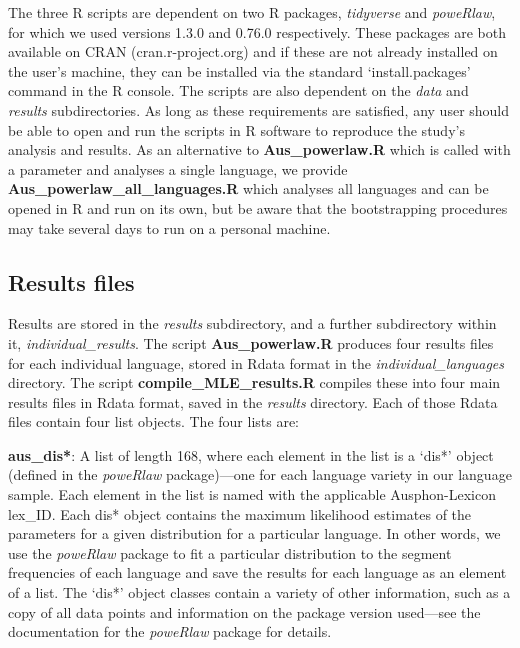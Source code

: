 The three R scripts are dependent on two R packages, \emph{tidyverse}
and \emph{poweRlaw}, for which we used versions 1.3.0 and 0.76.0
respectively. These packages are both available on CRAN
(cran.r-project.org) and if these are not already installed on the
user's machine, they can be installed via the standard
`install.packages' command in the R console. The scripts are also
dependent on the \emph{data} and \emph{results} subdirectories. As long
as these requirements are satisfied, any user should be able to open and
run the scripts in R software to reproduce the study's analysis and
results. As an alternative to \textbf{Aus\_powerlaw.R} which is called
with a parameter and analyses a single language, we provide
\textbf{Aus\_powerlaw\_all\_languages.R} which analyses all languages
and can be opened in R and run on its own, but be aware that the
bootstrapping procedures may take several days to run on a personal
machine.

\hypertarget{results-files}{%
\subsection{Results files}\label{results-files}}

Results are stored in the \emph{results} subdirectory, and a further
subdirectory within it, \emph{individual\_results}. The script
\textbf{Aus\_powerlaw.R} produces four results files for each individual
language, stored in Rdata format in the \emph{individual\_languages}
directory. The script \textbf{compile\_MLE\_results.R} compiles these
into four main results files in Rdata format, saved in the
\emph{results} directory. Each of those Rdata files contain four list
objects. The four lists are:

\textbf{aus\_dis*}: A list of length 168, where each element in the list
is a `dis*' object (defined in the \emph{poweRlaw} package)---one for
each language variety in our language sample. Each element in the list
is named with the applicable Ausphon-Lexicon lex\_ID. Each dis* object
contains the maximum likelihood estimates of the parameters for a given
distribution for a particular language. In other words, we use the
\emph{poweRlaw} package to fit a particular distribution to the segment
frequencies of each language and save the results for each language as
an element of a list. The `dis*' object classes contain a variety of
other information, such as a copy of all data points and information on
the package version used---see the documentation for the \emph{poweRlaw}
package for details.

